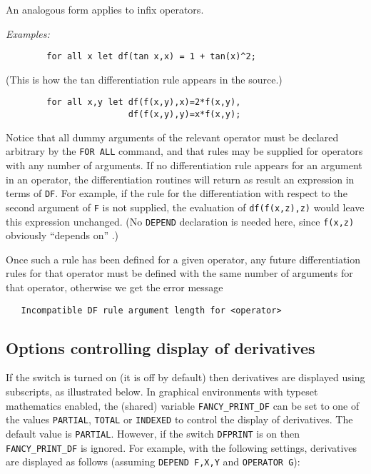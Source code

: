 An analogous form applies to infix operators.

\textit{Examples:}
\begin{verbatim}
        for all x let df(tan x,x) = 1 + tan(x)^2;
\end{verbatim}
(This is how the tan differentiation rule appears in the {\REDUCE}
source.)
\begin{verbatim}
        for all x,y let df(f(x,y),x)=2*f(x,y),
                        df(f(x,y),y)=x*f(x,y);
\end{verbatim}
Notice that all dummy arguments of the relevant operator must be declared
arbitrary by the \texttt{FOR ALL} command, and that rules may be supplied for
operators with any number of arguments.  If no differentiation rule
appears for an argument in an operator, the differentiation routines will
return as result an expression in terms of \texttt{DF}.  For
example, if the rule for the differentiation with respect to the second
argument of \texttt{F} is not supplied, the evaluation of \texttt{df(f(x,z),z)}
would leave this expression unchanged. (No \texttt{DEPEND} declaration
is needed here, since \texttt{f(x,z)} obviously ``depends on'' .)

Once such a rule has been defined for a given operator, any future
differentiation rules for that operator must be
defined with the same number of arguments for that operator, otherwise we
get the error message
\begin{verbatim}
   Incompatible DF rule argument length for <operator>
\end{verbatim}


\subsection{Options controlling display of derivatives}
\hypertarget{switch:DFPRINT}{}

If the switch  is turned on (it is
off by default) then derivatives are displayed using subscripts, as
illustrated below.  In graphical environments with typeset mathematics
enabled, the (shared) variable
\texttt{FANCY\_PRINT\_DF} can be set to one
of the values \texttt{PARTIAL},
\texttt{TOTAL} or \texttt{INDEXED} to
control the display of derivatives.  The default value is
\texttt{PARTIAL}.  However, if the switch \texttt{DFPRINT} is on then
\texttt{FANCY\_PRINT\_DF} is ignored.  For example, with the following
settings, derivatives are displayed as follows (assuming
\texttt{DEPEND F,X,Y} and \texttt{OPERATOR G}):

